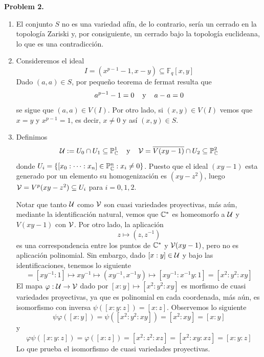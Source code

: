 \documentclass{article}
\begin{document}
\vspace{5mm}
\noindent\textbf{Problem 2.}
\begin{enumerate}
    \item[(a)] El conjunto $S$ no es una variedad afín, de lo contrario, sería un cerrado en
    la topología Zariski y, por consiguiente, un cerrado bajo la topología euclideana, lo que es 
    una contradicción.

    \item[(b)] Consideremos el ideal
    \begin{equation*}
        I=(x^{p-1}-1,x-y)\subseteq\mathbb{F}_{q}[x,y]
    \end{equation*}
    Dado $(a,a)\in S$, por pequeño teorema de fermat resulta que
    \begin{equation*}
        a^{p-1}-1=0 \hspace{4mm}\text{y}\hspace{4mm} a-a=0
    \end{equation*}
    se sigue que $(a,a)\in V(I)$. Por otro lado, si $(x,y)\in V(I)$ vemos que $x=y$ y $x^{p-1}=1$,
    es decir, $x\neq0$ y así $(x,y)\in S$.

    \item[(c)] Definimos
    \begin{equation*}
        \mathcal{U}:=U_{0}\cap U_{1}\subseteq\mathbb{P}_{\mathbb{C}}^{1} \hspace{4mm}\text{y}\hspace{4mm} 
        \mathcal{V}=\overline{V(xy-1)}\cap U_{2}\subseteq\mathbb{P}_{\mathbb{C}}^{2}
    \end{equation*}
    donde $U_{i}=\{[x_{0}:\cdots:x_{n}]\in\mathbb{P}_{\mathbb{C}}^{n}:x_{i}\neq0\}$. Puesto que el ideal
    $(xy-1)$ esta generado por un elemento su homogenización es $(xy-z^{2})$, luego
    $\mathcal{V}=V^{p}(xy-z^{2})\subseteq U_{i}$ para $i=0,1,2$.

    \vspace{1mm}
    Notar que tanto $\mathcal{U}$ como $\mathcal{V}$ son cuasi variedades proyectivas, más aún, mediante la 
    identificación natural, vemos que $\mathbb{C}^{*}$ es homeomorfo a $\mathcal{U}$ y $V(xy-1)$ con $\mathcal{V}$. Por
    otro lado, la aplicación
    \begin{equation*}
        z\mapsto(z,z^{-1})
    \end{equation*}
    es una correspondencia entre los puntos de $\mathbb{C}^{*}$ y $\mathcal{V}(xy-1)$, pero no es aplicación 
    polinomial. Sin embargo, dado $[x:y]\in\mathcal{U}$ y bajo las identificaciones, tenemos lo siguiente
    \begin{equation*}
        [x:y]=[xy^{-1}:1]\mapsto xy^{-1}\mapsto(xy^{-1},x^{-1}y)\mapsto [xy^{-1}:x^{-1}y:1]
        =[x^{2}:y^{2}:xy]
    \end{equation*}
    El mapa $\varphi:\mathcal{U}\to\mathcal{V}$ dado por $[x:y]\mapsto[x^{2}:y^{2}:xy]$ es morfismo de cuasi 
    variedades proyectivas, ya que es polinomial en cada coordenada, más aún, es isomorfismo con 
    inversa $\psi([x:y:z])=[x:z]$. Observemos lo siguiente
    \begin{equation*}
        \psi\varphi([x:y])=\psi([x^{2}:y^{2}:xy])=[x^{2}:xy]=[x:y]
    \end{equation*}
    y
    \begin{equation*}
        \varphi\psi([x:y:z])=\varphi([x:z])=[x^{2}:z^{2}:xz]=[x^{2}:xy:xz]=[x:y:z]
    \end{equation*}
    Lo que prueba el isomorfismo de cuasi variedades proyectivas.
\end{enumerate}
\end{document}
